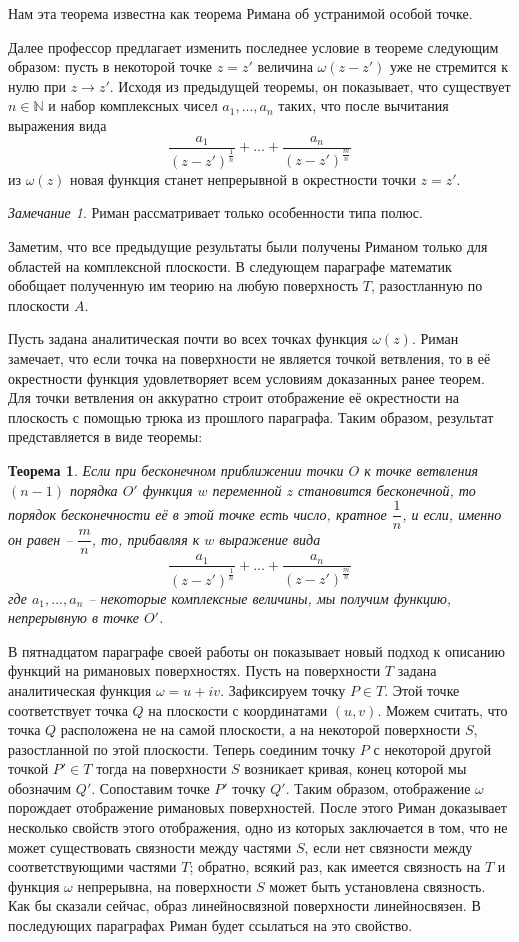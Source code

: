 \documentclass[a4paper,12pt]{article}
\newtheorem*{theorem}{Теорема}
\theoremstyle{remark}
\newtheorem*{remark}{Замечание}
\begin{document}
Нам эта теорема известна как теорема Римана об устранимой особой точке.

Далее профессор предлагает изменить последнее условие в теореме следующим образом:
пусть в некоторой точке $z = z'$ величина $\omega (z - z')$ уже не стремится к нулю при $z\rightarrow z'$.
Исходя из предыдущей теоремы, он показывает, что существует $n \in \mathbb{N}$ и набор комплексных чисел $a_1, ..., a_n$ таких,
что после вычитания выражения вида
\[\dfrac{a_1}{(z-z')^{\frac{1}{n}}}+ ...+ \dfrac{a_n}{(z-z')^{\frac{m}{n}}}\]
из $\omega(z)$ новая функция станет непрерывной в окрестности точки $z = z'$.
\begin{remark}
  Риман рассматривает только особенности типа полюс.
\end{remark}

Заметим, что все предыдущие результаты были получены Риманом только для областей на комплексной
плоскости. В следующем параграфе математик обобщает полученную им
теорию на любую поверхность $T$, разостланную по плоскости $A$.

Пусть задана аналитическая почти во всех точках функция
$\omega(z)$. Риман замечает, что если точка на поверхности не является точкой ветвления, то в её
окрестности функция удовлетворяет всем условиям доказанных ранее теорем.
Для точки ветвления он аккуратно строит отображение её окрестности на плоскость с помощью трюка из прошлого параграфа.
Таким образом, результат представляется в виде теоремы:
\begin{theorem}
  Если при бесконечном приближении точки $O$ к точке ветвления $(n-1)$ порядка
  $O'$ функция $w$ переменной $z$ становится бесконечной, то
  порядок бесконечности её в этой точке есть число, кратное $\dfrac{1}{n}$, и если,
  именно он равен -- $\dfrac{m}{n}$, то, прибавляя к $w$ выражение вида
  \[\dfrac{a_1}{(z-z')^{\frac{1}{n}}}+ ...+ \dfrac{a_n}{(z-z')^{\frac{m}{n}}}\]
  где $a_1, ..., a_n$ -- некоторые комплексные величины, мы получим
  функцию, непрерывную в точке $O'$.
\end{theorem}

В пятнадцатом параграфе своей работы он показывает новый подход к описанию функций на римановых поверхностях. Пусть на поверхности $T$ задана аналитическая функция $\omega = u + iv$.
Зафиксируем точку $P \in T$. Этой точке соответствует точка $Q$ на плоскости с координатами
$(u, v)$. Можем считать, что точка $Q$ расположена не на самой плоскости, а на некоторой поверхности $S$, разостланной по этой плоскости. Теперь соединим точку $P$ с некоторой другой точкой
$P' \in T$ тогда на поверхности $S$ возникает кривая, конец которой мы обозначим $Q'$. Сопоставим точке $P'$ точку $Q'$. Таким образом, отображение $\omega$ порождает отображение римановых
поверхностей. После этого Риман доказывает несколько свойств этого отображения, одно из которых заключается в том, что
не может существовать связности между частями $S$, если нет связности между соответствующими частями $T$; обратно, всякий раз, как имеется связность на $T$ и функция $\omega$
непрерывна, на поверхности $S$ может быть установлена связность.
Как бы сказали сейчас, образ линейносвязной поверхности линейносвязен.
В последующих параграфах Риман будет ссылаться на это свойство.
\end{document}
